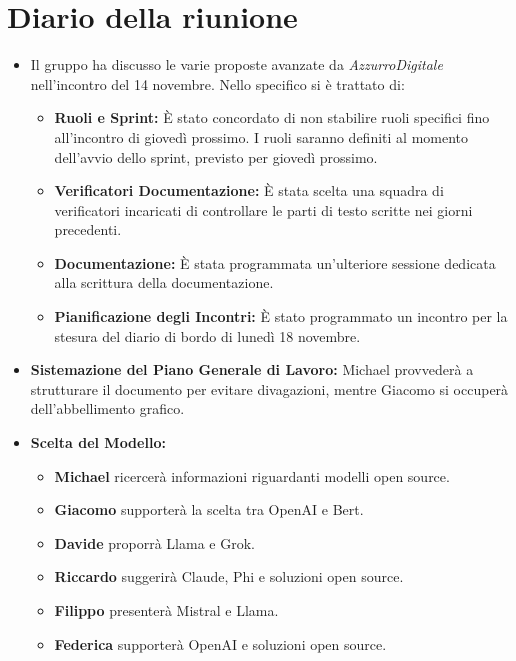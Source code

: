 
\section{Diario della riunione}

\begin{itemize}
    \item Il gruppo ha discusso le varie proposte avanzate da \emph{AzzurroDigitale} nell'incontro del 14 novembre. Nello specifico si è trattato di:
    \begin{itemize}
        \renewcommand{\labelitemii}{--}
        \item \textbf{Ruoli e Sprint:} È stato concordato di non stabilire ruoli specifici fino all'incontro di giovedì prossimo. I ruoli saranno definiti al momento dell'avvio dello sprint, previsto per giovedì prossimo.
        \item \textbf{Verificatori Documentazione:} È stata scelta una squadra di verificatori incaricati di controllare le parti di testo scritte nei giorni precedenti.
        \item \textbf{Documentazione:} È stata programmata un'ulteriore sessione dedicata alla scrittura della documentazione.
        \item \textbf{Pianificazione degli Incontri:} È stato programmato un incontro per la stesura del diario di bordo di lunedì 18 novembre.
    \end{itemize}
    
    \item \textbf{Sistemazione del Piano Generale di Lavoro:} Michael provvederà a strutturare il documento per evitare divagazioni, mentre Giacomo si occuperà dell'abbellimento grafico.
    
    \item \textbf{Scelta del Modello:}
    \begin{itemize}
        \renewcommand{\labelitemii}{--}
        \item \textbf{Michael} ricercerà informazioni riguardanti modelli open source.
        \item \textbf{Giacomo} supporterà la scelta tra OpenAI e Bert.
        \item \textbf{Davide} proporrà Llama e Grok.
        \item \textbf{Riccardo} suggerirà Claude, Phi e soluzioni open source.
        \item \textbf{Filippo} presenterà Mistral e Llama.
        \item \textbf{Federica} supporterà OpenAI e soluzioni open source.
    \end{itemize}
    

\end{itemize}
